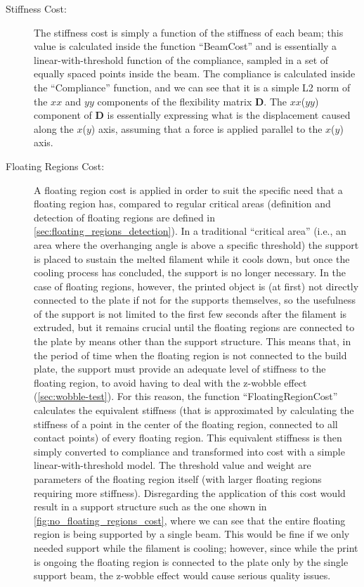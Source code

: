 \begin{description}
    \item[Stiffness Cost:] 
    The stiffness cost is simply a function of the stiffness of each beam; this value is calculated
    inside the function ``BeamCost'' and is essentially a linear-with-threshold function of the compliance,
    sampled in a set of equally spaced points inside the beam.
    The compliance is calculated inside the ``Compliance'' function, and we can see that it is a simple
    L2 norm of the $xx$ and $yy$ components of the flexibility matrix $\mathbf{D}$.
    The $xx$($yy$) component of $\mathbf{D}$ is essentially expressing what is the displacement
    caused along the $x$($y$) axis, assuming that a force is applied parallel to the $x$($y$) axis.
    \item[Floating Regions Cost:] 
    A floating region cost is applied in order to suit the specific need
    that a floating region has, compared to regular critical areas
    (definition and detection of floating regions are defined in \cref{sec:floating_regions_detection}).
    In a traditional ``critical area'' (i.e., an area where the overhanging angle
    is above a specific threshold) the support is placed to sustain the melted
    filament while it cools down, but once the cooling process has concluded, the support is no longer necessary.
    In the case of floating regions, however, the printed object is (at first) not directly connected to the plate
    if not for the supports themselves, so the usefulness of the support is not limited to the first few seconds
    after the filament is extruded, but it remains crucial until the floating regions are connected
    to the plate by means other than the support structure. This means that, in the period of time when the floating region is not connected
    to the build plate, the support must provide an adequate level of stiffness to the floating region,
    to avoid having to deal with the z-wobble effect (\cref{sec:wobble-test}).
    For this reason, the function ``FloatingRegionCost'' calculates the equivalent stiffness (that is approximated by calculating the stiffness of a point
    in the center of the floating region, connected to all contact points) of every floating region.
    This equivalent stiffness is then simply converted to compliance and transformed into cost with a simple
    linear-with-threshold model.
    The threshold value and weight are parameters of the floating region itself (with larger floating regions
    requiring more stiffness).
    Disregarding the application of this cost would result in a support structure such as the one shown in
    \cref{fig:no_floating_regions_cost}, where we can see that the entire floating region is being supported by a
    single beam. This would be fine if we only needed support while the filament is cooling; however,
    since while the print is ongoing the floating region is connected to the plate only
    by the single support beam, the z-wobble effect would cause serious quality issues.
\end{description}



